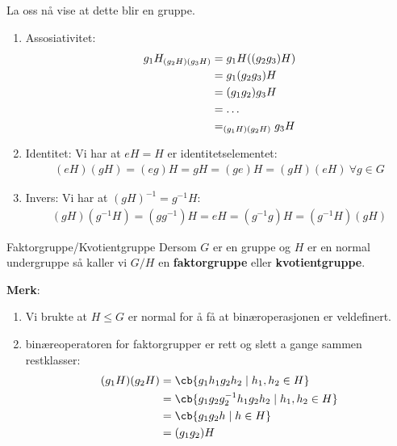 La oss nå vise at dette blir en gruppe.
\begin{enumerate}[label=$\mathscr{G}$\arabic*)]
	\item Assosiativitet:
	      \begin{align}
		      g_1H\sb{(g_2H)(g_3H)} & = g_1H((g_2g_3)H)       \\
		                            & = g_1(g_2g_3)H          \\
		                            & = (g_1g_2)g_3H          \\
		                            & = \dots                 \\
		                            & = \sb{(g_1H)(g_2H)}g_3H
	      \end{align}
	\item Identitet: Vi har at $eH=H$ er identitetselementet:
	      \begin{align}
		      (eH)(gH)=(eg)H=gH=(ge)H=(gH)(eH)\ \forall g\in G
	      \end{align}
	\item Invers: Vi har at $(gH)^{-1}=g^{-1}H$:
	      \begin{align}
		      (gH)(g^{-1}H)=(gg^{-1})H=eH=(g^{-1}g)H=(g^{-1}H)(gH)
	      \end{align}
\end{enumerate}

\begin{definition}{Faktorgruppe/Kvotientgruppe}{}
	Dersom $G$ er en gruppe og $H$ er en normal undergruppe så kaller vi $G/H$ en
	\textbf{faktorgruppe} eller \textbf{kvotientgruppe}.
\end{definition}

\textbf{Merk}:
\begin{enumerate}
	\item Vi brukte at $H\leq G$ er normal for å få at binæroperasjonen er veldefinert.
	\item binæreoperatoren for faktorgrupper er rett og slett a gange sammen restklasser:
	      \begin{align}
		      (g_1H)(g_2H) & = \cb{g_1h_1g_2h_2\mid h_1, h_2\in H}            \\
		                   & = \cb{g_1g_2g_2^{-1}h_1g_2h_2\mid h_1, h_2\in H} \\
		                   & = \cb{g_1g_2h\mid h\in H}                        \\
		                   & = (g_1g_2)H
	      \end{align}
\end{enumerate}

